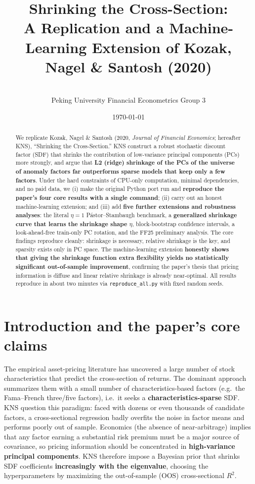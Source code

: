 \documentclass[11pt,a4paper]{article}
\title{\textbf{Shrinking the Cross-Section:\\ A Replication and a Machine-Learning Extension of Kozak, Nagel \& Santosh (2020)}}
\author{\memberA~\sidA \quad \memberB~\sidB \\[2pt]
\small Peking University \quad Financial Econometrics \quad Group 3}
\date{\today}
\newcommand{\Rtwo}{R^2}
\begin{document}
\maketitle

\begin{abstract}
\noindent We replicate Kozak, Nagel \& Santosh (2020, \emph{Journal of Financial Economics}; hereafter KNS),
``Shrinking the Cross-Section.'' KNS construct a robust stochastic discount factor (SDF) that shrinks the
contribution of low-variance principal components (PCs) more strongly, and argue that \textbf{L2 (ridge)
shrinkage of the PCs of the universe of anomaly factors far outperforms sparse models that keep only a few
factors}. Under the hard constraints of CPU-only computation, minimal dependencies, and no paid data, we
(i) make the original Python port run and \textbf{reproduce the paper's four core results with a single command};
(ii) carry out an honest machine-learning extension; and (iii) add \textbf{five further extensions and robustness
analyses}: the literal $\eta{=}1$ Pástor--Stambaugh benchmark, a \textbf{generalized shrinkage curve that learns
the shrinkage shape $\eta$}, block-bootstrap confidence intervals, a look-ahead-free train-only PC rotation, and
the FF25 preliminary analysis. The core findings reproduce cleanly: shrinkage is necessary, relative shrinkage is
the key, and sparsity exists only in PC space. The machine-learning extension \textbf{honestly shows that giving
the shrinkage function extra flexibility yields no statistically significant out-of-sample improvement}, confirming
the paper's thesis that pricing information is diffuse and linear relative shrinkage is already near-optimal. All
results reproduce in about two minutes via \texttt{reproduce\_all.py} with fixed random seeds.
\end{abstract}

\section{Introduction and the paper's core claims}
The empirical asset-pricing literature has uncovered a large number of stock characteristics that predict the
cross-section of returns. The dominant approach summarizes them with a small number of characteristics-based
factors (e.g.\ the Fama--French three/five factors), i.e.\ it seeks a \textbf{characteristics-sparse} SDF. KNS
question this paradigm: faced with dozens or even thousands of candidate factors, a cross-sectional regression
badly overfits the noise in factor means and performs poorly out of sample. Economics (the absence of near-arbitrage)
implies that any factor earning a substantial risk premium must be a major source of covariance, so pricing
information should be concentrated in \textbf{high-variance principal components}. KNS therefore impose a Bayesian
prior that shrinks SDF coefficients \textbf{increasingly with the eigenvalue}, choosing the hyperparameters by
maximizing the out-of-sample (OOS) cross-sectional $\Rtwo$.
\end{document}
